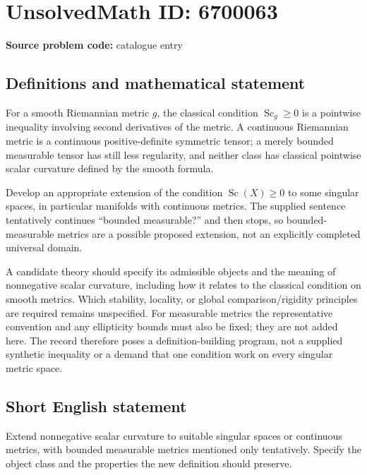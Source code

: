 \documentclass[11pt]{article}
\begin{document}
\section*{UnsolvedMath ID: 6700063}
\textbf{Source problem code:} catalogue entry
\subsection{Definitions and mathematical statement}
For a smooth Riemannian metric $g$, the classical condition $\operatorname{Sc}_g\geq0$ is a pointwise inequality involving second derivatives of the metric. A continuous Riemannian metric is a continuous positive-definite symmetric tensor; a merely bounded measurable tensor has still less regularity, and neither class has classical pointwise scalar curvature defined by the smooth formula.

Develop an appropriate extension of the condition $\operatorname{Sc}(X)\geq0$ to some singular spaces, in particular manifolds with continuous metrics. The supplied sentence tentatively continues ``bounded measurable?'' and then stops, so bounded-measurable metrics are a possible proposed extension, not an explicitly completed universal domain.

A candidate theory should specify its admissible objects and the meaning of nonnegative scalar curvature, including how it relates to the classical condition on smooth metrics. Which stability, locality, or global comparison/rigidity principles are required remains unspecified. For measurable metrics the representative convention and any ellipticity bounds must also be fixed; they are not added here. The record therefore poses a definition-building program, not a supplied synthetic inequality or a demand that one condition work on every singular metric space.
\subsection{Short English statement}
Extend nonnegative scalar curvature to suitable singular spaces or continuous metrics, with bounded measurable metrics mentioned only tentatively. Specify the object class and the properties the new definition should preserve.
\end{document}
